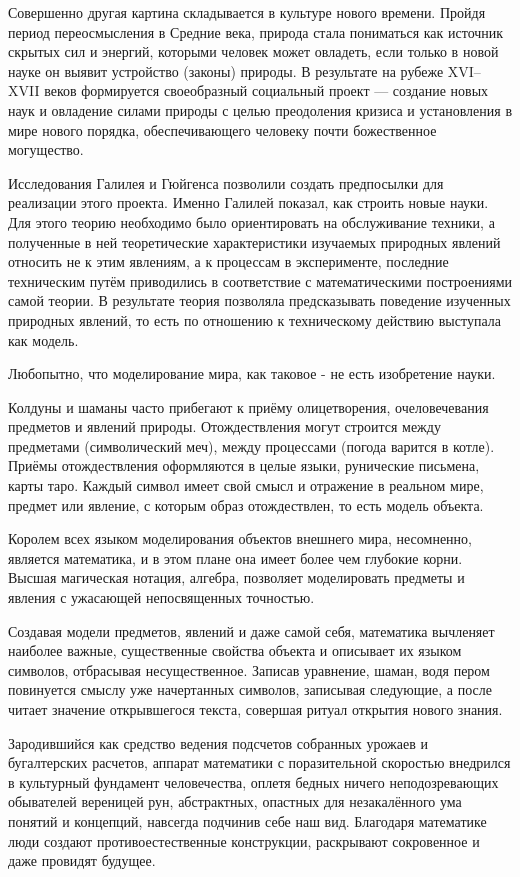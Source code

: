 \documentclass[a4paper]{article}
\begin{document}
{Совершенно другая картина складывается в культуре нового времени. Пройдя период переосмысления в Средние века, природа стала пониматься как источник скрытых сил и энергий, которыми человек может овладеть, если только в новой науке он выявит устройство (законы) природы. В результате на рубеже XVI–XVII веков формируется своеобразный социальный проект — создание новых наук и овладение силами природы с целью преодоления кризиса и установления в мире нового порядка, обеспечивающего человеку почти божественное могущество.

Исследования Галилея и Гюйгенса позволили создать предпосылки для реализации этого проекта. Именно Галилей показал, как строить новые науки. Для этого теорию необходимо было ориентировать на обслуживание техники, а полученные в ней теоретические характеристики изучаемых природных явлений относить не к этим явлениям, а к процессам в эксперименте, последние техническим путём приводились в соответствие с математическими построениями самой теории. В результате теория позволяла предсказывать поведение изученных природных явлений, то есть по отношению к техническому действию выступала как модель.

Любопытно, что моделирование мира, как таковое - не есть изобретение науки.

Колдуны и шаманы часто прибегают к приёму олицетворения, очеловечевания предметов и явлений природы. Отождествления могут строится между предметами (символический меч), между процессами (погода варится в котле). Приёмы отождествления оформляются в целые языки, рунические письмена, карты таро. Каждый символ имеет свой смысл и отражение в реальном мире, предмет или явление, с которым образ отождествлен, то есть модель объекта.

Королем всех языком моделирования объектов внешнего мира, несомненно, является математика, и в этом плане она имеет более чем глубокие корни. Высшая магическая нотация, алгебра, позволяет моделировать предметы и явления с ужасающей непосвященных точностью.

Создавая модели предметов, явлений и даже самой себя, математика вычленяет наиболее важные, существенные свойства объекта и описывает их языком символов, отбрасывая несущественное. Записав уравнение, шаман, водя пером повинуется смыслу уже начертанных символов, записывая следующие, а после читает значение открывшегося текста, совершая ритуал открытия нового знания.

Зародившийся как средство ведения подсчетов собранных урожаев и бугалтерских расчетов, аппарат математики с поразительной скоростью внедрился в культурный фундамент человечества, оплетя бедных ничего неподозревающих обывателей вереницей рун, абстрактных, опастных для незакалённого ума понятий и концепций, навсегда подчинив себе наш вид. Благодаря математике люди создают противоестественные конструкции, раскрывают сокровенное и даже провидят будущее.

}
\end{document}

